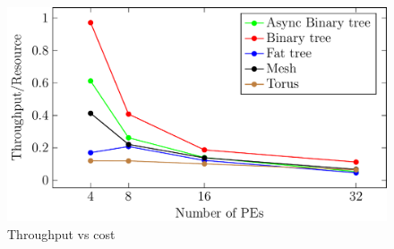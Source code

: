 \begin{figure}[t]
\centering
   \includegraphics[width=\columnwidth]{Data/tputVsCost.pdf}
   \vspace{-5mm}
   \caption{Throughput vs cost}
   \vspace{-5mm}
      \label{fig:tputPerf}
\end{figure}
